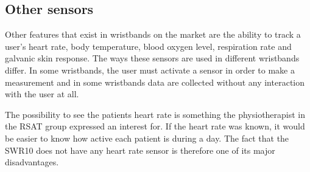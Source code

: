\documentclass{cslthse-msc}
\begin{document}
\subsection{Other sensors}
Other features that exist in wristbands on the market are the ability to track a user's heart rate, body temperature, blood oxygen level, respiration rate and galvanic skin response. The ways these sensors are used in different wristbands differ. In some wristbands, the user must activate a sensor in order to make a measurement and in some wristbands data are collected without any interaction with the user at all. 

The possibility to see the patients heart rate is something the physiotherapist in the RSAT group expressed an interest for. If the heart rate was known, it would be easier to know how active each patient is during a day. The fact that the SWR10 does not have any heart rate sensor is therefore one of its major disadvantages.


\end{document}
